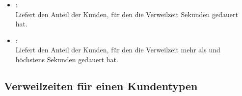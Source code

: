 \begin{itemize}
\item
{}:\\
Liefert den Anteil der Kunden, für den die Verweilzeit  Sekunden gedauert hat.

\item
{}:\\
Liefert den Anteil der Kunden, für den die Verweilzeit mehr als  und höchstens  Sekunden gedauert hat.

\end{itemize}  



\subsection{Verweilzeiten für einen Kundentypen}

